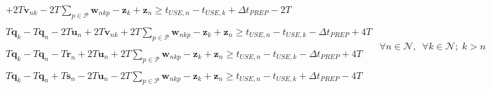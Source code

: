 \documentclass{beamer}
\begin{document}
\begin{frame}
\begin{equation*}
\begin{split}
\begin{aligned}
            + 2T \boldsymbol{v}_{nk} - 2T \sum_{p \in \mathcal{P}}
            \boldsymbol{w}_{nkp} - \boldsymbol{z}_{k} + \boldsymbol{z}_{n}
            \ge t_{\mathit{USE},n} - t_{\mathit{USE},k}
            + \Delta t_{\mathit{PREP}} - 2T
        \end{aligned}\\
        \begin{aligned}
            T \boldsymbol{q}_{k} - T \boldsymbol{q}_{n} - 2T \boldsymbol{u}_{n} 
            + 2T \boldsymbol{v}_{nk} + 2T \sum_{p \in \mathcal{P}}
            \boldsymbol{w}_{nkp} - \boldsymbol{z}_{k} + \boldsymbol{z}_{n}
            \ge t_{\mathit{USE},n} - t_{\mathit{USE},k}
            - \Delta t_{\mathit{PREP}} + 4T
        \end{aligned}\\
        \begin{aligned}
            T \boldsymbol{q}_{k} - T \boldsymbol{q}_{n} - T \boldsymbol{r}_{n}
            + 2T \boldsymbol{u}_{n} + 2T \sum_{p \in \mathcal{P}}
            \boldsymbol{w}_{nkp} - \boldsymbol{z}_{k} + \boldsymbol{z}_{n}
            \ge t_{\mathit{USE},n} - t_{\mathit{USE},k}
            - \Delta t_{\mathit{PREP}} + 4T
        \end{aligned}\\
        \begin{aligned}
            T \boldsymbol{q}_{k} - T \boldsymbol{q}_{n} + T \boldsymbol{s}_{n}
            - 2T \boldsymbol{u}_{n} - 2T \sum_{p \in \mathcal{P}}
            \boldsymbol{w}_{nkp} - \boldsymbol{z}_{k} + \boldsymbol{z}_{n}
            \ge t_{\mathit{USE},n} - t_{\mathit{USE},k}
            + \Delta t_{\mathit{PREP}} - 4T
        \end{aligned}\\
    \end{split}
    \forall n \in \mathcal{N}, \enspace \forall k \in \mathcal{N}; \;
            k > n
\end{equation*}
\end{frame}
\end{document}
